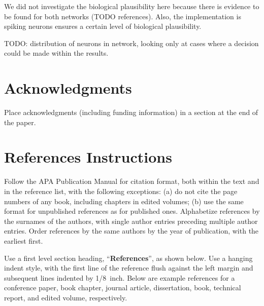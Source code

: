 \documentclass[10pt,letterpaper]{article}
\begin{document}
We did not investigate the biological plausibility here because there is 
evidence to be found for both networks (TODO references). Also, the 
implementation is spiking neurons ensures a certain level of biological 
plausibility.

TODO\@: distribution of neurons in network, looking only at cases where 
a decision could be made within the results.

\section{Acknowledgments}

Place acknowledgments (including funding information) in a section at
the end of the paper.


\section{References Instructions}

Follow the APA Publication Manual for citation format, both within the
text and in the reference list, with the following exceptions: (a) do
not cite the page numbers of any book, including chapters in edited
volumes; (b) use the same format for unpublished references as for
published ones. Alphabetize references by the surnames of the authors,
with single author entries preceding multiple author entries. Order
references by the same authors by the year of publication, with the
earliest first.

Use a first level section heading, ``{\bf References}'', as shown
below. Use a hanging indent style, with the first line of the
reference flush against the left margin and subsequent lines indented
by 1/8~inch. Below are example references for a conference paper, book
chapter, journal article, dissertation, book, technical report, and
edited volume, respectively.

\nocite{ChalnickBillman1988a}
\nocite{Feigenbaum1963a}
\nocite{Hill1983a}
\nocite{OhlssonLangley1985a}
\nocite{Matlock2001}
\nocite{NewellSimon1972a}
\nocite{ShragerLangley1990a}




\setlength{\bibleftmargin}{.125in}
\setlength{\bibindent}{-\bibleftmargin}


\end{document}
